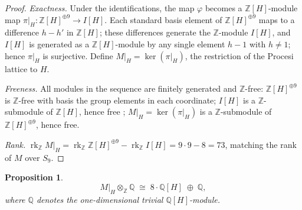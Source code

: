 \documentclass[12pt,a4paper]{article}
\newtheorem{proposition}[theorem]{Proposition}
\theoremstyle{definition}
\DeclareMathOperator{\rk}{rk}
\begin{document}
\begin{proof}
\emph{Exactness.}
Under the identifications, the map \(\varphi\) becomes a
\(\mathbb{Z}[H]\)-module map
\(\pi|_H : \mathbb{Z}[H]^{\oplus 9} \longrightarrow I[H]\).
Each standard basis element of \(\mathbb{Z}[H]^{\oplus 9}\) maps to
a difference \(h - h'\) in \(\mathbb{Z}[H]\); these differences
generate the \(\mathbb{Z}\)-module \(I[H]\), and \(I[H]\) is generated
as a \(\mathbb{Z}[H]\)-module by any single element \(h-1\) with
\(h \neq 1\); hence \(\pi|_H\) is surjective.
Define \(M|_H = \ker(\pi|_H)\), the restriction of the Procesi
lattice to \(H\).

\medskip\noindent
\emph{Freeness.}
All modules in the sequence are finitely generated and
\(\mathbb{Z}\)-free: \(\mathbb{Z}[H]^{\oplus 9}\) is \(\mathbb{Z}\)-free
with basis the group elements in each coordinate; \(I[H]\) is a
\(\mathbb{Z}\)-submodule of \(\mathbb{Z}[H]\), hence free
\cite[Ch.VII, \S3, Th.1, Cor.2]{Bourbaki2007b};
\(M|_H = \ker(\pi|_H)\) is a \(\mathbb{Z}\)-submodule of
\(\mathbb{Z}[H]^{\oplus 9}\), hence free.

\medskip\noindent
\emph{Rank.}
\(\rk_{\mathbb{Z}} M|_H
= \rk_{\mathbb{Z}} \mathbb{Z}[H]^{\oplus 9}
- \rk_{\mathbb{Z}} I[H]
= 9 \cdot 9 - 8 = 73\),
matching the rank of \(M\) over \(S_9\).
\end{proof}

\begin{proposition}\label{prop:MH-char}
\[
M|_H \otimes_{\mathbb{Z}} \mathbb{Q} \;\cong\; 8\cdot \mathbb{Q}[H] \;\oplus\;
\mathbb{Q},
\]
where \(\mathbb{Q}\) denotes the one-dimensional trivial
\(\mathbb{Q}[H]\)-module.
\end{proposition}
\end{document}
